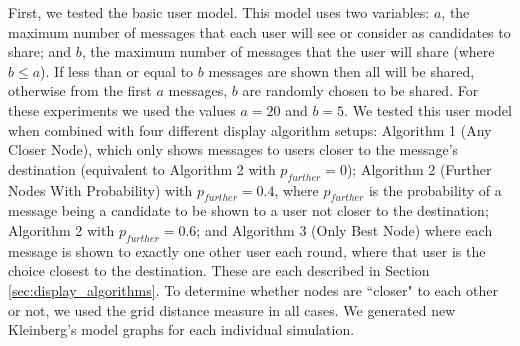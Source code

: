 \documentclass[bsc,frontabs,twoside,singlespacing,parskip,deptreport]{infthesis}     %
\begin{document}
First, we tested the basic user model. This model uses two variables: $a$, the maximum number of messages that each user will see or consider as candidates to share; and $b$, the maximum number of messages that the user will share (where $b \leq a$). If less than or equal to $b$ messages are shown then all will be shared, otherwise from the first $a$ messages, $b$ are randomly chosen to be shared. For these experiments we used the values $a = 20$ and $b = 5$. We tested this user model when combined with four different display algorithm setups: Algorithm 1 (Any Closer Node), which only shows messages to users closer to the message's destination (equivalent to Algorithm 2 with $p_{further}=0$); Algorithm 2 (Further Nodes With Probability) with $p_{further}=0.4$, where $p_{further}$ is the probability of a message being a candidate to be shown to a user not closer to the destination; Algorithm 2 with $p_{further}=0.6$; and Algorithm 3 (Only Best Node) where each message is shown to exactly one other user each round, where that user is the choice closest to the destination. These are each described in Section \ref{sec:display_algorithms}. To determine whether nodes are ``closer" to each other or not, we used the grid distance measure in all cases. We generated new Kleinberg's model graphs for each individual simulation.
\end{document}

